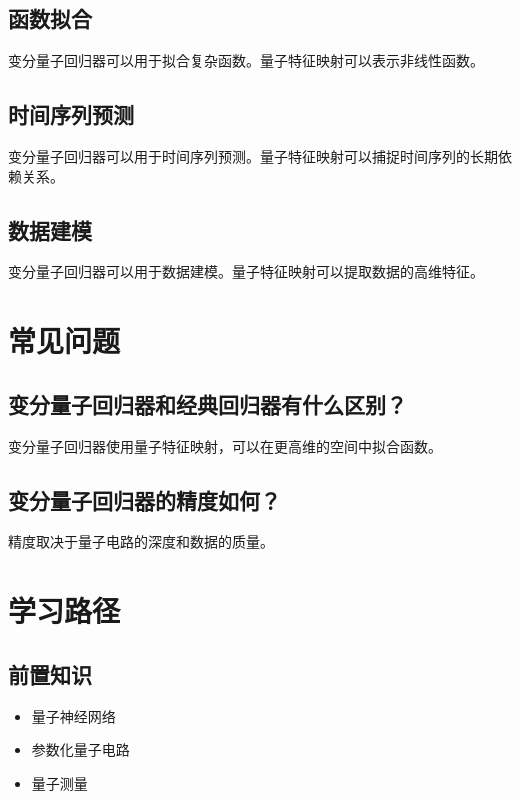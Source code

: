 \documentclass[12pt,a4paper]{article}
\begin{document}
\subsection{函数拟合}

变分量子回归器可以用于拟合复杂函数。量子特征映射可以表示非线性函数。

\subsection{时间序列预测}

变分量子回归器可以用于时间序列预测。量子特征映射可以捕捉时间序列的长期依赖关系。

\subsection{数据建模}

变分量子回归器可以用于数据建模。量子特征映射可以提取数据的高维特征。

\section{常见问题}

\subsection{变分量子回归器和经典回归器有什么区别？}

变分量子回归器使用量子特征映射，可以在更高维的空间中拟合函数。

\subsection{变分量子回归器的精度如何？}

精度取决于量子电路的深度和数据的质量。

\section{学习路径}

\subsection{前置知识}
\begin{itemize}
  \item 量子神经网络
  \item 参数化量子电路
  \item 量子测量
\end{itemize}
\end{document}
